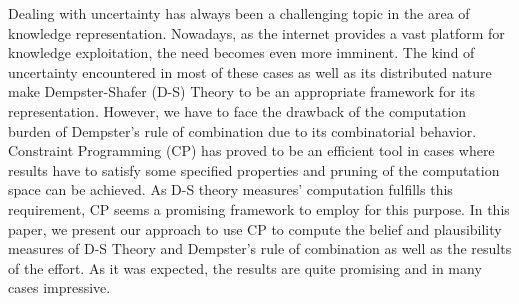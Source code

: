Dealing with uncertainty has always been a challenging topic in the area of knowledge representation. Nowadays, as the internet provides a vast platform for knowledge exploitation, the need becomes even more imminent. The kind of uncertainty encountered in most of these cases as well as its distributed nature make Dempster-Shafer (D-S) Theory to be an appropriate framework for its representation. However, we have to face the drawback of the computation burden of Dempster's rule of combination due to its combinatorial behavior. Constraint Programming (CP) has proved to be an efficient tool in cases where results have to satisfy some specified properties and pruning of the computation space can be achieved. As D-S theory measures' computation fulfills this requirement, CP seems a promising framework to employ for this purpose. In this paper, we present our approach to use CP to compute the belief and plausibility measures of D-S Theory and Dempster's rule of combination as well as the results of the effort. As it was expected, the results are quite promising and in many cases impressive.



